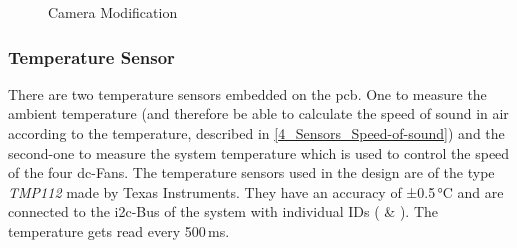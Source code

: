 \begin{figure}[h!]
    \centering
    \qquad
    \caption{Camera Modification}
    \label{fig:camera-modification}
\end{figure}


\subsubsection{Temperature Sensor}
There are two temperature sensors embedded on the \acrshort{pcb}. One to measure the ambient temperature (and therefore be able to calculate the speed of sound in air according to the temperature, described in \ref{4_Sensors_Speed-of-sound}) and the second-one to measure the system temperature which is used to control the speed of the four \acrshort{dc}-Fans. The temperature sensors used in the design are of the type \textit{TMP112} made by Texas Instruments. They have an accuracy of ±0.5\,°C and are connected to the \acrshort{i2c}-Bus of the system with individual IDs ( \& ). The temperature gets read every 500\,ms.

